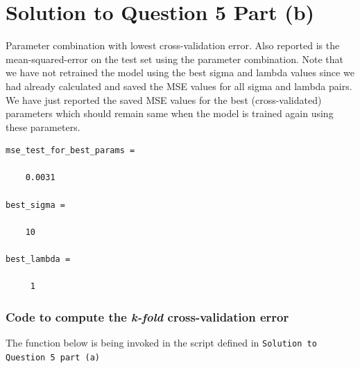 \documentclass[a4paper,11pt]{article}
\begin{document}
\section*{Solution to Question 5 Part (b)}
Parameter combination with lowest cross-validation error. Also reported is the mean-squared-error on the test set using the parameter combination. Note that we have not retrained the model using the best sigma and lambda values since we had already calculated and saved the MSE values for all sigma and lambda pairs. We have just reported the saved MSE values for the best (cross-validated) parameters which should remain same when the model is trained again using these parameters. 

\begin{verbatim}
mse_test_for_best_params =

    0.0031

best_sigma =

    10

best_lambda =

     1
\end{verbatim}
\subsubsection*{Code to compute the \textit{k-fold} cross-validation error}
The function below is being invoked in the script defined in \texttt{Solution to Question 5 part (a)}
\inputminted[baselinestretch=1, fontsize=\small, breaklines=true]{octave}{../get_k_fold_cv_error_new.m}
\end{document}
